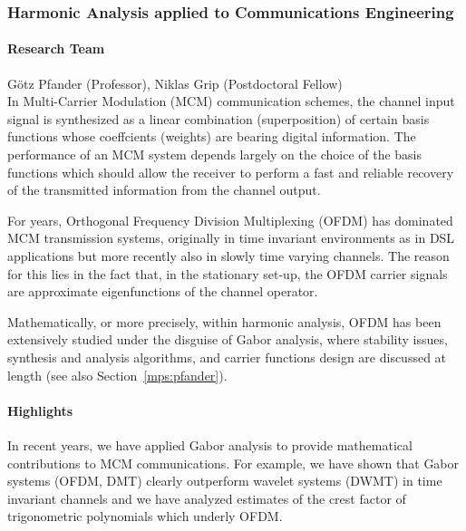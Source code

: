 \subsubsection{Harmonic Analysis applied to Communications
               Engineering}\label{ict:pfander}

\paragraph{Research Team}
G\"{o}tz Pfander (Professor), Niklas Grip (Postdoctoral Fellow)\\


In Multi-Carrier Modulation (MCM) communication schemes, the
channel input signal is synthesized as a linear combination
(superposition) of certain basis functions whose coeffcients
(weights) are bearing digital information. The performance of an
MCM system depends largely on the choice of the basis functions
which should allow the receiver to perform a fast and reliable
recovery of the transmitted information from the channel output.

For years, Orthogonal Frequency Division Multiplexing (OFDM) has
dominated MCM transmission systems, originally in time invariant
environments as in DSL applications but more recently also in slowly
time varying channels. The reason for this lies in the fact that, in
the stationary set-up, the OFDM carrier signals are approximate
eigenfunctions of the channel operator.

Mathematically, or more precisely, within harmonic analysis, OFDM
has been extensively studied under the disguise of Gabor analysis,
where stability issues, synthesis and analysis algorithms, and
carrier functions design are discussed at length (see also
Section~\ref{mps:pfander}).


\paragraph{Highlights}

In recent years, we have applied Gabor analysis to provide
mathematical contributions to MCM communications. For example, we
have shown that Gabor systems (OFDM, DMT) clearly outperform wavelet
systems (DWMT) in time invariant channels and we have analyzed
estimates of the crest factor of trigonometric polynomials which
underly OFDM.

